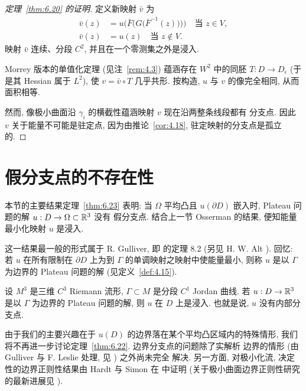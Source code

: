 \begin{proof}[定理~\ref{thm:6.20} 的证明]
定义新映射 $\bar{v}$ 为
\begin{equation}
\begin{aligned}
\bar{v}(z)&=u\bigl(\bar{F}\bigl(G\bigl(\bar{F}^{-1}(z)\bigr)\bigr)\bigr)
\quad\text{当 }z\in V,\\
\bar{v}(z)&=u(z)\quad\text{当 }z\notin V.
\end{aligned}
\label{eq:6.79}
\end{equation}
映射 $\bar{v}$ 连续、分段 $C^2$, 并且在一个零测集之外是浸入.

Morrey 版本的单值化定理 (见注~\ref{rem:4.3}) 蕴涵存在 $W^2$ 中的同胚
$T:D\to D_\epsilon$ (于是其 Hessian 属于 $L^2$), 使 $v=\bar{v}\circ T$
几乎共形. 按构造, $u$ 与 $v$ 的像完全相同, 从而面积相等.

然而, 像极小曲面沿 $\gamma_i$ 的横截性蕴涵映射 $v$ 现在沿两整条线段都有
分支点. 因此 $v$ 关于能量不可能是驻定点, 因为由推论~\ref{cor:4.18},
驻定映射的分支点是孤立的.
\end{proof}

\section{假分支点的不存在性}
\label{sec:6.4}

本节的主要结果定理~\ref{thm:6.23} 表明: 当 $\Omega$ 平均凸且
$u(\partial D)$ 嵌入时, Plateau 问题的解 $u:D\to\Omega\subset\mathbb{R}^3$ 没有
假分支点. 结合上一节 Osserman 的结果, 便知能量最小化映射 $u$ 是浸入.

这一结果最一般的形式属于 R. Gulliver, 即 \cite{Gu} 的定理 8.2 (另见
H. W. Alt \cite{Alt}). 回忆: 若 $u$ 在所有限制在 $\partial D$ 上为到
$\Gamma$ 的单调映射之映射中使能量最小, 则称 $u$ 是以 $\Gamma$ 为边界的
Plateau 问题的解 (见定义~\ref{def:4.15}).

\begin{theorem}
\label{thm:6.22}
设 $M^3$ 是三维 $C^3$ Riemann 流形, $\Gamma\subset M$ 是分段 $C^1$
Jordan 曲线. 若 $u:D\to\mathbb{R}^3$ 是以 $\Gamma$ 为边界的 Plateau 问题的解,
则 $u$ 在 $D$ 上是浸入. 也就是说, $u$ 没有内部分支点.
\end{theorem}

由于我们的主要兴趣在于 $u(D)$ 的边界落在某个平均凸区域内的特殊情形,
我们将不再进一步讨论定理~\ref{thm:6.22}. 边界分支点的问题除了实解析
边界的情形 (由 Gulliver 与 F. Leslie 处理, 见 \cite{GuLe}) 之外尚未完全
解决. 另一方面, 对极小化流, 决定性的边界正则性结果由 Hardt 与 Simon 在
\cite{HaSi} 中证明 (关于极小曲面边界正则性研究的最新进展见 \cite{Wh2}).

